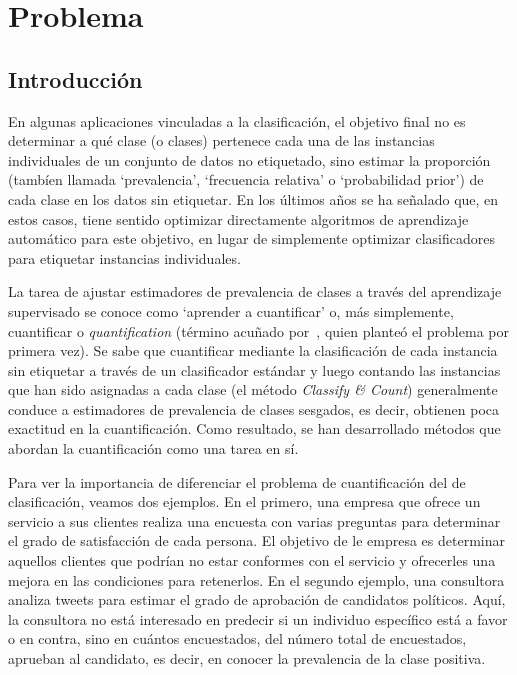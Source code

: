 \chapter{Problema}\label{problema}

\section{Introducción}\label{problema:introduccion}

En algunas aplicaciones vinculadas a la clasificación, el objetivo final no es
determinar a qué clase (o clases) pertenece cada una de las instancias
individuales de un conjunto de datos no etiquetado, sino estimar la proporción
(tambíen llamada `prevalencia', `frecuencia relativa' o `probabilidad prior') de
cada clase en los datos sin etiquetar. En los últimos años se ha señalado que,
en estos casos, tiene sentido optimizar directamente algoritmos de aprendizaje
automático para este objetivo, en lugar de simplemente optimizar clasificadores
para etiquetar instancias individuales.

La tarea de ajustar estimadores de prevalencia de clases a través del
aprendizaje supervisado se conoce como `aprender a cuantificar' o, más
simplemente, cuantificar o {\it quantification\/} (término acuñado
por~\citet{forman2005counting}, quien planteó el problema por primera vez). Se
sabe que cuantificar mediante la clasificación de cada instancia sin etiquetar a
través de un clasificador estándar y luego contando las instancias que han sido
asignadas a cada clase (el método {\it Classify \& Count\/}) generalmente
conduce a estimadores de prevalencia de clases sesgados, es decir, obtienen poca
exactitud en la cuantificación. Como resultado, se han desarrollado métodos que
abordan la cuantificación como una tarea en sí.

Para ver la importancia de diferenciar el problema de cuantificación del de
clasificación, veamos dos ejemplos. En el primero, una empresa que ofrece un
servicio a sus clientes realiza una encuesta con varias preguntas para
determinar el grado de satisfacción de cada persona. El objetivo de le empresa
es determinar aquellos clientes que podrían no estar conformes con el servicio y
ofrecerles una mejora en las condiciones para retenerlos. En el segundo ejemplo,
una consultora analiza tweets para estimar el grado de aprobación de candidatos
políticos. Aquí, la consultora no está interesado en predecir si un individuo
específico está a favor o en contra, sino en cuántos encuestados, del número
total de encuestados, aprueban al candidato, es decir, en conocer la prevalencia
de la clase positiva.


